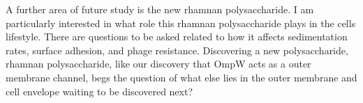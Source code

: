 A further area of future study is the new rhamnan polysaccharide. I am particularly interested in what role this rhamnan polysaccharide plays in the cells lifestyle. There are questions to be asked related to how it affects sedimentation rates, surface adhesion,  and phage resistance. Discovering a new polysaccharide, rhamnan polysaccharide, like our discovery that OmpW acts as a outer membrane channel, begs the question of what else lies in the outer membrane and cell envelope waiting to be discovered next?
